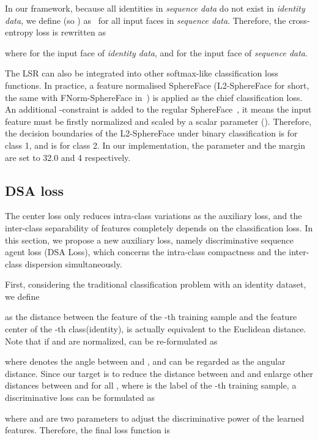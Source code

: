 \documentclass[conference]{acmsiggraph}
\begin{document}
In our framework, because all identities in \emph{sequence data} do not exist in \emph{identity data}, we define  (so ) as~\cite{lsro} for all input faces in \emph{sequence data}. Therefore, the cross-entropy loss is rewritten as

where  for the input face of \emph{identity data}, and  for the input face of \emph{sequence data}.

The LSR can also be integrated into other softmax-like classification loss functions. In practice, a feature normalised SphereFace (L2-SphereFace for short, the same with FNorm-SphereFace in~\cite{arcface}) is applied as the chief classification loss. An additional -constraint is added to the regular SphereFace~\cite{sphereface}, it means the input feature  must be firstly normalized and scaled by a scalar parameter  (). Therefore, the decision boundaries of the L2-SphereFace under binary classification is  for class 1, and is  for class 2. In our implementation, the parameter  and the margin  are set to 32.0 and 4 respectively.


\subsection{DSA loss}
\label{secDSA}

The center loss only reduces intra-class variations as the auxiliary loss, and the inter-class separability of features completely depends on the classification loss. In this section, we propose a new auxiliary loss, namely discriminative sequence agent loss (DSA Loss), which concerns the intra-class compactness and the inter-class dispersion simultaneously.

First, considering the traditional classification problem with an identity dataset, we define 

 as the distance between the feature  of the -th training sample and the feature center  of the -th class(identity),  is actually equivalent to the Euclidean distance. Note that if  and  are normalized,  can be re-formulated as
 
where  denotes the angle between  and , and  can be regarded as the angular distance. Since our target is to reduce the distance between  and  and enlarge other distances between  and  for all , where  is the label of the -th training sample, a discriminative loss can be formulated as 

where  and  are two parameters to adjust the discriminative power of the learned features. Therefore, the final loss function is
\end{document}
